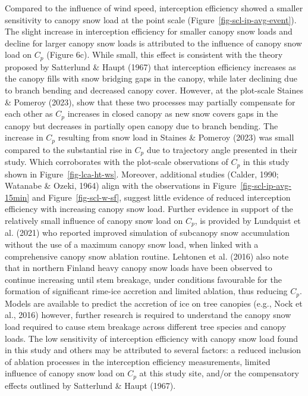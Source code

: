 \documentclass[
  letterpaper,
  DIV=11,
  numbers=noendperiod]{scrartcl}
\begin{document}
Compared to the influence of wind speed, interception efficiency showed
a smaller sensitivity to canopy snow load at the point scale
(Figure~\ref{fig-scl-ip-avg-event}). The slight increase in interception
efficiency for smaller canopy snow loads and decline for larger canopy
snow loads is attributed to the influence of canopy snow load on \(C_p\)
(Figure 6c). While small, this effect is consistent with the theory
proposed by Satterlund \& Haupt (1967) that interception efficiency
increases as the canopy fills with snow bridging gaps in the canopy,
while later declining due to branch bending and decreased canopy cover.
However, at the plot-scale Staines \& Pomeroy (2023), show that these
two processes may partially compensate for each other as \(C_p\)
increases in closed canopy as new snow covers gaps in the canopy but
decreases in partially open canopy due to branch bending. The increase
in \(C_p\) resulting from snow load in Staines \& Pomeroy (2023) was
small compared to the substantial rise in \(C_p\) due to trajectory
angle presented in their study. Which corroborates with the plot-scale
observations of \(C_p\) in this study shown in
Figure~\ref{fig-lca-ht-ws}. Moreover, additional studies (Calder, 1990;
Watanabe \& Ozeki, 1964) align with the observations in
Figure~\ref{fig-scl-ip-avg-15min} and Figure~\ref{fig-scl-w-sf}, suggest
little evidence of reduced interception efficiency with increasing
canopy snow load. Further evidence in support of the relatively small
influence of canopy snow load on \(C_p\), is provided by Lundquist et
al. (2021) who reported improved simulation of subcanopy snow
accumulation without the use of a maximum canopy snow load, when linked
with a comprehensive canopy snow ablation routine. Lehtonen et al.
(2016) also note that in northern Finland heavy canopy snow loads have
been observed to continue increasing until stem breakage, under
conditions favourable for the formation of significant rime-ice
accretion and limited ablation, thus reducing \(C_p\). Models are
available to predict the accretion of ice on tree canopies (e.g., Nock
et al., 2016) however, further research is required to understand the
canopy snow load required to cause stem breakage across different tree
species and canopy loads. The low sensitivity of interception efficiency
with canopy snow load found in this study and others may be attributed
to several factors: a reduced inclusion of ablation processes in the
interception efficiency measurements, limited influence of canopy snow
load on \(C_p\) at this study site, and/or the compensatory effects
outlined by Satterlund \& Haupt (1967).
\end{document}
